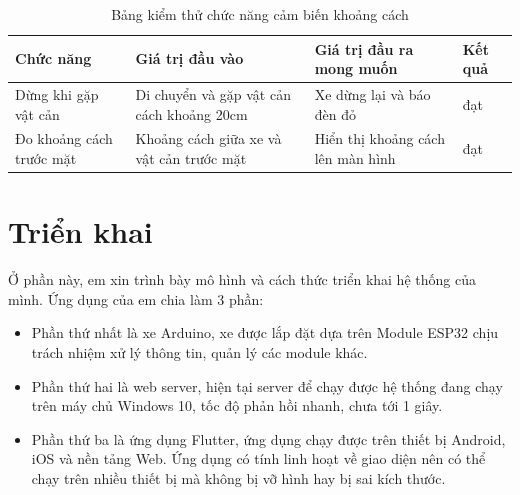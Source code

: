 \documentclass[../DoAn.tex]{subfiles}
\begin{document}
\begin{table}[H]
\begin{tabular}{| p{3cm} | p{4cm} | p{5cm} | p{2cm} |}
\hline
\rowcolor[HTML]{FFCE93} 
\textbf{Chức năng} & \textbf{Giá trị đầu vào}       & \textbf{Giá trị đầu ra mong muốn}                            & Kết quả \\ \hline
Dừng khi gặp vật cản          & Di chuyển và gặp vật cản cách khoảng 20cm & Xe dừng lại và báo đèn đỏ & đạt    \\ \hline
Đo khoảng cách trước mặt          & Khoảng cách giữa xe và vật cản trước mặt & Hiển thị khoảng cách lên màn hình          & đạt     \\ \hline
\end{tabular}
\caption{Bảng kiểm thử chức năng cảm biến khoảng cách}
\end{table}

\section{Triển khai}

Ở phần này, em xin trình bày mô hình và cách thức triển khai hệ thống của mình. Ứng dụng của em chia làm 3 phần:

\begin{itemize}
    \item Phần thứ nhất là xe Arduino, xe được lắp đặt dựa trên Module ESP32 chịu trách nhiệm xử lý thông tin, quản lý các module khác.
    \item Phần thứ hai là web server, hiện tại server để chạy được hệ thống đang chạy trên máy chủ Windows 10, tốc độ phản hồi nhanh, chưa tới 1 giây.
    \item Phần thứ ba là ứng dụng Flutter, ứng dụng chạy được trên thiết bị Android, iOS và nền tảng Web. Ứng dụng có tính linh hoạt về giao diện nên có thể chạy trên nhiều thiết bị mà không bị vỡ hình hay bị sai kích thước.
\end{itemize}
\end{document}
